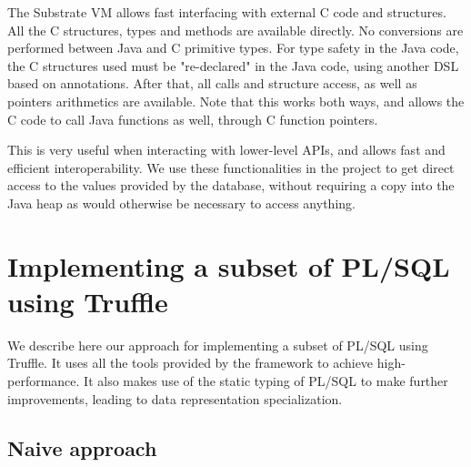 \documentclass[twoside,11pt,a4paper]{article}
\newcommand{\maybe}[1]{\textit{(maybe ? #1)}}
\newcommand{\pls}[1]{\small\texttt{#1}\normalsize}
\newcommand{\plstype}[1]{\pls{#1}}
\newcommand{\plsi}{\plstype{PLS\_INTEGER}}
\newcommand{\simpleint}{\plstype{SIMPLE\_INTEGER}}
\newcommand{\startsection}[1]{
	\cleardoublepage
	\section{#1}
	\thispagestyle{basic}
}
\begin{document}
The Substrate VM allows fast interfacing with external C code and structures. All the C structures, types and methods are available directly. No conversions are performed between Java and C primitive types. For type safety in the Java code, the C structures used must be "re-declared" in the Java code, using another DSL based on annotations. After that, all calls and structure access, as well as pointers arithmetics are available. Note that this works both ways, and allows the C code to call Java functions as well, through C function pointers.

This is very useful when interacting with lower-level APIs, and allows fast and efficient interoperability. We use these functionalities in the project to get direct access to the values provided by the database, without requiring a copy into the Java heap as would otherwise be necessary to access anything.

\startsection{Implementing a subset of PL/SQL using Truffle}
\thispagestyle{plain}

We describe here our approach for implementing a subset of PL/SQL using Truffle. It uses all the tools provided by the framework to achieve high-performance. It also makes use of the static typing of PL/SQL to make further improvements, leading to data representation specialization.


\subsection{Naive approach}

\end{document}
